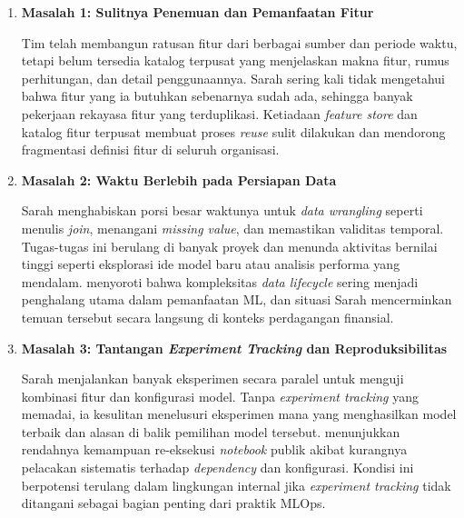 \begin{enumerate}
    \vspace{0.5em}
    \begin{enumerate}[label=\alph*)]
        \item \textbf{Masalah 1: Sulitnya Penemuan dan Pemanfaatan Fitur}
        
        Tim telah membangun ratusan fitur dari berbagai sumber dan periode waktu, tetapi belum tersedia katalog terpusat yang menjelaskan makna fitur, rumus perhitungan, dan detail penggunaannya. Sarah sering kali tidak mengetahui bahwa fitur yang ia butuhkan sebenarnya sudah ada, sehingga banyak pekerjaan rekayasa fitur yang terduplikasi. Ketiadaan \textit{feature store} dan katalog fitur terpusat membuat proses \textit{reuse} sulit dilakukan dan mendorong fragmentasi definisi fitur di seluruh organisasi.

        \vspace{0.5em}

        \item \textbf{Masalah 2: Waktu Berlebih pada Persiapan Data}
        
        Sarah menghabiskan porsi besar waktunya untuk \textit{data wrangling} seperti menulis \textit{join}, menangani \textit{missing value}, dan memastikan validitas temporal. Tugas-tugas ini berulang di banyak proyek dan menunda aktivitas bernilai tinggi seperti eksplorasi ide model baru atau analisis performa yang mendalam. \textcite{polyzotis2018data} menyoroti bahwa kompleksitas \textit{data lifecycle} sering menjadi penghalang utama dalam pemanfaatan ML, dan situasi Sarah mencerminkan temuan tersebut secara langsung di konteks perdagangan finansial.

        \vspace{0.5em}

        \item \textbf{Masalah 3: Tantangan \textit{Experiment Tracking} dan Reproduksibilitas}
        
        Sarah menjalankan banyak eksperimen secara paralel untuk menguji kombinasi fitur dan konfigurasi model. Tanpa \textit{experiment tracking} yang memadai, ia kesulitan menelusuri eksperimen mana yang menghasilkan model terbaik dan alasan di balik pemilihan model tersebut. \textcite{pimentel2019notebooks} menunjukkan rendahnya kemampuan re-eksekusi \textit{notebook} publik akibat kurangnya pelacakan sistematis terhadap \textit{dependency} dan konfigurasi. Kondisi ini berpotensi terulang dalam lingkungan internal jika \textit{experiment tracking} tidak ditangani sebagai bagian penting dari praktik MLOps.


\end{enumerate}
\end{enumerate}
